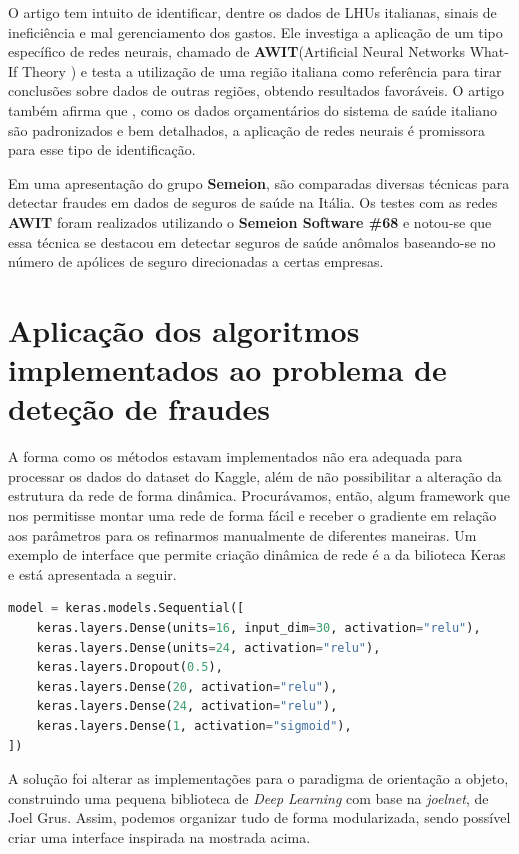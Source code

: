 \documentclass[11pt]{article}
\begin{document}
\noindent
O artigo \cite{fraudeItalia2} tem intuito de identificar, dentre os dados de LHUs italianas, sinais de ineficiência e mal gerenciamento dos gastos. Ele investiga a aplicação de um tipo específico de redes neurais, chamado de \textbf{AWIT}\supercite{AWIT}(Artificial Neural Networks What-If Theory ) e testa a utilização de uma região italiana como referência para tirar conclusões sobre dados de outras regiões, obtendo  resultados favoráveis. O artigo também afirma que , como os dados orçamentários do sistema de saúde italiano são padronizados e bem detalhados, a aplicação de redes neurais é promissora para esse tipo de identificação.

Em uma apresentação do grupo \textbf{Semeion}\supercite{SEMEION}, são comparadas diversas técnicas para detectar fraudes em dados de seguros de saúde na Itália. Os testes com as redes \textbf{AWIT} foram realizados utilizando o \textbf{Semeion Software \#68} e notou-se que essa técnica se destacou em detectar seguros de saúde anômalos baseando-se no número de apólices de seguro direcionadas a certas empresas.


\section{Aplicação dos algoritmos implementados ao problema de deteção de fraudes}

A forma como os métodos estavam implementados não era adequada para processar os dados do dataset do Kaggle, além de não possibilitar a alteração da estrutura da rede de forma dinâmica. Procurávamos, então, algum framework que nos permitisse montar uma rede de forma fácil e receber o gradiente em relação aos parâmetros para os refinarmos manualmente de diferentes maneiras. Um exemplo de interface que permite criação dinâmica de rede é a da bilioteca Keras\supercite{KERAS} e está apresentada a seguir.\\
\begin{lstlisting}[language=Python, caption=Interface do Keras]
model = keras.models.Sequential([
    keras.layers.Dense(units=16, input_dim=30, activation="relu"),
    keras.layers.Dense(units=24, activation="relu"),  
    keras.layers.Dropout(0.5),  
    keras.layers.Dense(20, activation="relu"),  
    keras.layers.Dense(24, activation="relu"),  
    keras.layers.Dense(1, activation="sigmoid"),  
])
\end{lstlisting}


\noindent
A solução foi alterar as implementações para o paradigma de orientação a objeto, construindo uma pequena biblioteca de \textit{Deep Learning} com base na \textit{joelnet}\supercite{joelnet}, de Joel Grus. Assim, podemos organizar tudo de forma modularizada, sendo possível criar uma interface inspirada na mostrada acima.
\end{document}
